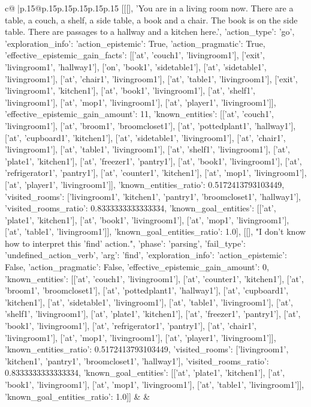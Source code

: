 \documentclass{article}
\begin{document}
{\begin{supertabular}{c@{$\;$}|p{.15\linewidth}@{}p{.15\linewidth}p{.15\linewidth}p{.15\linewidth}p{.15\linewidth}p{.15\linewidth}}
{{{	 [[[], 'You are in a living room now. There are a table, a couch, a shelf, a side table, a book and a chair. The book is on the side table. There are passages to a hallway and a kitchen here.', {'action_type': 'go', 'exploration_info': {'action_epistemic': True, 'action_pragmatic': True, 'effective_epistemic_gain_facts': [['at', 'couch1', 'livingroom1'], ['exit', 'livingroom1', 'hallway1'], ['on', 'book1', 'sidetable1'], ['at', 'sidetable1', 'livingroom1'], ['at', 'chair1', 'livingroom1'], ['at', 'table1', 'livingroom1'], ['exit', 'livingroom1', 'kitchen1'], ['at', 'book1', 'livingroom1'], ['at', 'shelf1', 'livingroom1'], ['at', 'mop1', 'livingroom1'], ['at', 'player1', 'livingroom1']], 'effective_epistemic_gain_amount': 11, 'known_entities': [['at', 'couch1', 'livingroom1'], ['at', 'broom1', 'broomcloset1'], ['at', 'pottedplant1', 'hallway1'], ['at', 'cupboard1', 'kitchen1'], ['at', 'sidetable1', 'livingroom1'], ['at', 'chair1', 'livingroom1'], ['at', 'table1', 'livingroom1'], ['at', 'shelf1', 'livingroom1'], ['at', 'plate1', 'kitchen1'], ['at', 'freezer1', 'pantry1'], ['at', 'book1', 'livingroom1'], ['at', 'refrigerator1', 'pantry1'], ['at', 'counter1', 'kitchen1'], ['at', 'mop1', 'livingroom1'], ['at', 'player1', 'livingroom1']], 'known_entities_ratio': 0.5172413793103449, 'visited_rooms': ['livingroom1', 'kitchen1', 'pantry1', 'broomcloset1', 'hallway1'], 'visited_rooms_ratio': 0.8333333333333334, 'known_goal_entities': [['at', 'plate1', 'kitchen1'], ['at', 'book1', 'livingroom1'], ['at', 'mop1', 'livingroom1'], ['at', 'table1', 'livingroom1']], 'known_goal_entities_ratio': 1.0}}], [[], "I don't know how to interpret this 'find' action.", {'phase': 'parsing', 'fail_type': 'undefined_action_verb', 'arg': 'find', 'exploration_info': {'action_epistemic': False, 'action_pragmatic': False, 'effective_epistemic_gain_amount': 0, 'known_entities': [['at', 'couch1', 'livingroom1'], ['at', 'counter1', 'kitchen1'], ['at', 'broom1', 'broomcloset1'], ['at', 'pottedplant1', 'hallway1'], ['at', 'cupboard1', 'kitchen1'], ['at', 'sidetable1', 'livingroom1'], ['at', 'table1', 'livingroom1'], ['at', 'shelf1', 'livingroom1'], ['at', 'plate1', 'kitchen1'], ['at', 'freezer1', 'pantry1'], ['at', 'book1', 'livingroom1'], ['at', 'refrigerator1', 'pantry1'], ['at', 'chair1', 'livingroom1'], ['at', 'mop1', 'livingroom1'], ['at', 'player1', 'livingroom1']], 'known_entities_ratio': 0.5172413793103449, 'visited_rooms': ['livingroom1', 'kitchen1', 'pantry1', 'broomcloset1', 'hallway1'], 'visited_rooms_ratio': 0.8333333333333334, 'known_goal_entities': [['at', 'plate1', 'kitchen1'], ['at', 'book1', 'livingroom1'], ['at', 'mop1', 'livingroom1'], ['at', 'table1', 'livingroom1']], 'known_goal_entities_ratio': 1.0}}]] 
	  } 
	   } 
	   } 
	 & & \\ 
 


\end{supertabular}}
\end{document}
